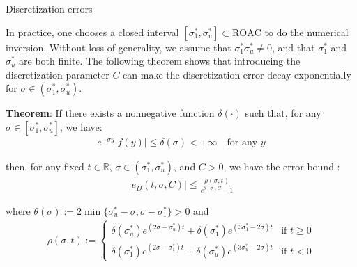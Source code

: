 \documentclass{beamer}
\begin{document}
\begin{frame}{Discretization errors}


    {\footnotesize \scriptsize
    \par In practice, one chooses a closed interval \([\sigma_1^*, \sigma_u^*] \subset \text{ROAC}\) to do the numerical inversion.
     Without loss of generality, we assume that \(\sigma_1^* \sigma_u^* \neq 0\), and that \(\sigma_1^*\) and \(\sigma_u^*\) are both finite. 
     The following theorem shows that introducing 
    the discretization parameter \(C\) can make the discretization error decay exponentially for \(\sigma \in (\sigma_1^*, \sigma_u^*)\).
    \vspace{1em}
    \par \textbf{Theorem}: If there exists a nonnegative function \(\delta(\cdot)\) such that, for any \(\sigma \in [\sigma_1^*, \sigma_u^*]\), 
    we have:
    \begin{align*}
        e^{-\sigma y} |f(y)| \leq \delta(\sigma) < +\infty \quad \text{for any } y
    \end{align*}
    \par then, for any fixed \( t \in \mathbb{R} \), \(\sigma \in (\sigma_1^*, \sigma_u^*)\), and \(C > 0\), we have the error bound :
    \begin{align*}
        |e_D(t, \sigma, C)| \leq \frac{\rho(\sigma, t)}{e^{\theta(\sigma)C} - 1}
    \end{align*}
    \par where \(\theta(\sigma) := 2 \min\{\sigma_u^* - \sigma, \sigma - \sigma_1^*\} > 0\) and  
    \begin{align*}
        \rho(\sigma, t) := 
    \begin{cases} 
    \delta(\sigma_u^*) e^{(2\sigma - \sigma_u^*)t} + \delta(\sigma_1^*) e^{(3\sigma_1^*-2\sigma)t} & \text{if } t \geq 0\\
    \delta(\sigma_1^*) e^{(2\sigma - \sigma_1^*)t} + \delta(\sigma_u^*) e^{(3\sigma_u^*-2\sigma)t} & \text{if } t < 0
    \end{cases}
    \end{align*}
    }
    
\end{frame}
\end{document}
